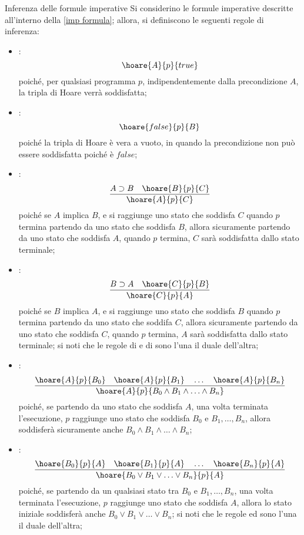 \documentclass[a4paper, 12pt]{report}
\begin{document}
    \begin{framedprop}{Inferenza delle formule imperative}
        Si considerino le formule imperative descritte all'interno della \cref{imp formula}; allora, si definiscono le seguenti regole di inferenza:

        \begin{itemize}
            \item {}: $$\hoare{A}{p}{true}$$ poiché, per qualsiasi programma $p$, indipendentemente dalla precondizione $A$, la tripla di Hoare verrà soddisfatta;
            \item {}: $$\hoare{false}{p}{B}$$ poiché la tripla di Hoare è vera a vuoto, in quando la precondizione non può essere soddisfatta poiché è $false$;
            \item {}: $$\dfrac{A \supset B \quad \hoare{B}{p}{C}}{\hoare{A}{p}{C}}$$ poiché se $A$ implica $B$, e si raggiunge uno stato che soddisfa $C$ quando $p$ termina partendo da uno stato che soddisfa $B$, allora sicuramente partendo da uno stato che soddisfa $A$, quando $p$ termina, $C$ sarà soddisfatta dallo stato terminale;
            \item {}: $$\dfrac{B \supset A \quad \hoare{C}{p}{B}}{\hoare{C}{p}{A}}$$ poiché se $B$ implica $A$, e si raggiunge uno stato che soddisfa $B$ quando $p$ termina partendo da uno stato che soddifa $C$, allora sicuramente partendo da uno stato che soddisfa $C$, quando $p$ termina, $A$ sarà soddisfatta dallo stato terminale; si noti che le regole di  e di  sono l'una il duale dell'altra;
            \item {}: $$\dfrac{\hoare{A}{p}{B_0} \quad \hoare{A}{p}{B_1} \quad \ldots \quad \hoare{A}{p}{B_n}}{\hoare{A}{p}{B_0 \land B_1 \land \ldots \land B_n}}$$ poiché, se partendo da uno stato che soddisfa $A$, una volta terminata l'esecuzione, $p$ raggiunge uno stato che soddisfa $B_0$ e $B_1, \ldots, B_n$, allora soddisferà sicuramente anche $B_0 \land B_1 \land \ldots \land B_n$;
            \item {}: $$\dfrac{\hoare{B_0}{p}{A} \quad \hoare{B_1}{p}{A} \quad \ldots \quad \hoare{B_n}{p}{A}}{\hoare{B_0 \lor B_1 \lor \ldots \lor B_n}{p}{A}}$$ poiché, se partendo da un qualsiasi stato tra $B_0$ e $B_1, \ldots, B_n$, una volta terminata l'esecuzione, $p$ raggiunge uno stato che soddisfa $A$, allora lo stato iniziale soddisferà anche $B_0 \lor B_1 \lor \ldots \lor B_n$; si noti che le regole  ed  sono l'una il duale dell'altra;
        \end{itemize}
    \end{framedprop}
\end{document}
